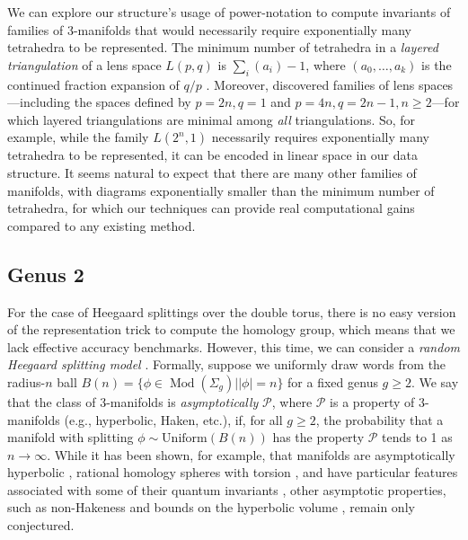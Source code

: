 \documentclass[11pt]{amsart}
\DeclareMathOperator{\Mod}{Mod}
\numberwithin{equation}{section}
\theoremstyle{plain}
\theoremstyle{definition}
\begin{document}
We can explore our structure's usage of power-notation to compute invariants of families of 3-manifolds that would necessarily require exponentially many tetrahedra to be represented.
The minimum number of tetrahedra in a \emph{layered triangulation} of a lens space $L(p,q)$ is $\sum_i(a_i)-1$, where $(a_0,\dots,a_k)$ is the continued fraction expansion of $q/p$ \cite{jaco2006layered}. 
Moreover, \cite{jaco2009minimal, jaco2011coverings} discovered families of lens spaces---including the spaces defined by $p=2n, q=1$ and $p=4n, q=2n-1, n\geq2$---for which layered triangulations are minimal among \emph{all} triangulations.
So, for example, while the family $L(2^n,1)$ necessarily requires exponentially many tetrahedra to be represented, it can be encoded in linear space in our data structure.
It seems natural to expect that there are many other families of manifolds, with diagrams exponentially smaller than the minimum number of tetrahedra, for which our techniques can provide real computational gains compared to any existing method.

\subsection{Genus 2}\label{sec: genus 2}
For the case of Heegaard splittings over the double torus, there is no easy version of the representation trick to compute the homology group, which means that we lack effective accuracy benchmarks.
However, this time, we can consider a \emph{random Heegaard splitting model} \cite{aschenbrenner20153}.
Formally, suppose we uniformly draw words from the radius-$n$ ball $B(n)=\{\phi \in \Mod(\Sigma_g)||\phi| = n\}$ for a fixed genus $g\geq 2$. 
We say that the class of 3-manifolds is \textit{asymptotically} $\mathcal{P}$, where $\mathcal{P}$ is a property of 3-manifolds (e.g., hyperbolic, Haken, etc.), if, for all $g\geq 2$, the probability that a manifold with splitting $\phi \sim \text{Uniform}(B(n))$ has the property $\mathcal{P}$ tends to 1 as $n\to\infty$.
While it has been shown, for example, that manifolds are asymptotically hyperbolic \cite{lubotzky2016random, https://doi.org/10.1112/jtopol/jtq031}, rational homology spheres with torsion \cite{dunfield2006finite}, and have particular features associated with some of their quantum invariants \cite{dunfield2011quantum}, other asymptotic properties, such as non-Hakeness and bounds on the hyperbolic volume \cite{rivin2014statistics}, remain only conjectured. 
\end{document}
